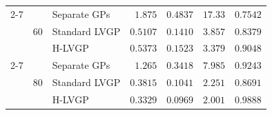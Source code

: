 \begin{table}[htbp]
\begin{tabular}{lllrrrr}
\cmidrule(lr){2-7}
 & \multirow{3}{*}{60} & Separate GPs & $1.875$ & $0.4837$ & $17.33$ & $0.7542$ \\
 &  & Standard LVGP & \colorbox{green!20}{\boldmath$0.5107$} & \colorbox{green!20}{\boldmath$0.1410$} & $3.857$ & $0.8379$ \\
 &  & H-LVGP & $0.5373$ & $0.1523$ & \colorbox{green!20}{\boldmath$3.379$} & \colorbox{green!20}{\boldmath$0.9048$} \\
\cmidrule(lr){2-7}
 & \multirow{3}{*}{80} & Separate GPs & $1.265$ & $0.3418$ & $7.985$ & \colorbox{green!20}{\boldmath$0.9243$} \\
 &  & Standard LVGP & $0.3815$ & $0.1041$ & $2.251$ & $0.8691$ \\
 &  & H-LVGP & \colorbox{green!20}{\boldmath$0.3329$} & \colorbox{green!20}{\boldmath$0.0969$} & \colorbox{green!20}{\boldmath$2.001$} & $0.9888$ \\
\bottomrule
\end{tabular}
\end{table}
